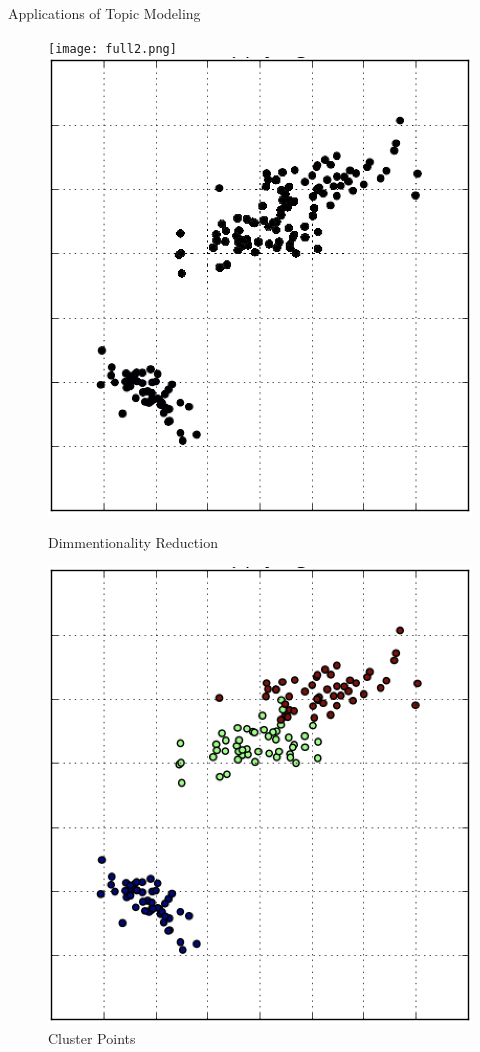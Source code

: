 \documentclass[10pt]{beamer}
\begin{document}
\begin{frame}{Applications of Topic Modeling}

  \begin{multicols}{4}

  \begin{figure}
  \texttt{[image: full2.png]}
  \includegraphics[width=.8\columnwidth]{reduced.png}
  \caption{Dimmentionality Reduction}
  \end{figure}

  \columnbreak

  \hfill
    \begin{figure}
  \includegraphics[width=\columnwidth]{cluster.png}
  \caption{Cluster Points}
  \end{figure}


\end{multicols}
\end{frame}
\end{document}
